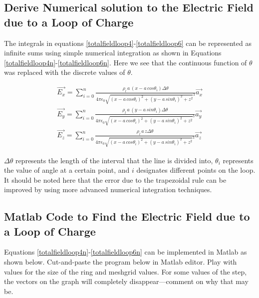 \documentclass{ximera}
\begin{document}
\subsection{Derive Numerical solution to the Electric Field due to a Loop of Charge}

The integrals in equations \ref{totalfieldloop4}-\ref{totalfieldloop6} can be represented as infinite sums using  simple numerical integration as shown in Equations \ref{totalfieldloop4n}-\ref{totalfieldloop6n}.  Here we see that the continuous function of $\theta$ was replaced with the discrete values of  $\theta$.




\begin{eqnarray}
\vec{E_x}= \sum_{i=0}^{n}\frac{\rho_l \,a \,        (x -  a \,cos{\theta_i})         \Delta \theta }{4 \pi \epsilon_{0} {  \sqrt{(x - a \,cos{\theta_i})^2 +(y - a \,sin{\theta_i})^2 +z ^2}  }^3}    \vec{a_x}  \label{totalfieldloop4n} \\
\vec{E_y}=  \sum_{i=0}^{n}\frac{\rho_l \, a \,   (y - a \,sin{\theta_i})  \Delta  \theta }{4 \pi \epsilon_{0} {  \sqrt{(x - a \,cos{\theta_i})^2 +(y - a \,sin{\theta_i})^2 +z ^2}  }^3}  \vec{a_y}  \label{totalfieldloop5n} \\
\vec{E_z}=  \sum_{i=0}^{n}\frac{\rho_l \, a \,  z   \Delta \theta }{4 \pi \epsilon_{0} {  \sqrt{(x - a \,cos{\theta_i})^2 +(y - a \,sin{\theta_i})^2 +z ^2}  }^3}  \vec{a_z} \label{totalfieldloop6n}
\end{eqnarray}

$\Delta\theta$ represents the length of the interval that the line is divided into, $\theta_i$ represents the value of angle at a certain point, and $i$ designates different points on the loop. It should be noted here that the error due to the trapezoidal rule can be improved by using more advanced numerical integration techniques.

\subsection{Matlab Code to Find the Electric Field due to a Loop of Charge }
 

Equations \ref{totalfieldloop4n}-\ref{totalfieldloop6n} can be implemented in Matlab as shown below. Cut-and-paste the program below in Matlab editor. Play with values for the size of the ring and meshgrid values. For some values of the step, the vectors on the graph will completely disappear—comment on why that may be.
\end{document}
